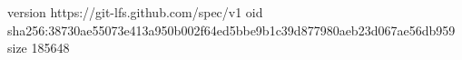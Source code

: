 version https://git-lfs.github.com/spec/v1
oid sha256:38730ae55073e413a950b002f64ed5bbe9b1c39d877980aeb23d067ae56db959
size 185648
